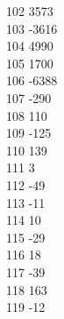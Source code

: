 { 102	3573 \\
 103	-3616 \\
 104	4990 \\
 105	1700 \\
 106	-6388 \\
 107	-290 \\
 108	110 \\
 109	-125 \\
 110	139 \\
 111	3 \\
 112	-49 \\
 113	-11 \\
 114	10 \\
 115	-29 \\
 116	18 \\
 117	-39 \\
 118	163 \\
 119	-12 \\
}
